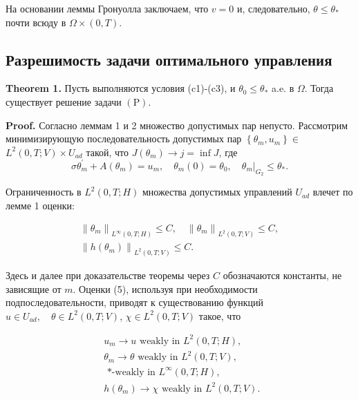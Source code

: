 На основании леммы Гронуолла заключаем,
что $v=0$ и, следовательно, $\theta \leq \theta_{*}$ почти всюду в $\Omega\times(0,T)$.

\subsection{Разрешимость задачи оптимального управления}
\label{subsec:ch3:sec2:subsec5}

\textbf{Theorem 1.}
Пусть выполняются условия (c1)-(c3), и $\theta_{0} \leq \theta_{*}$ a.e. в $\Omega$.
Тогда существует решение задачи $(\mathrm{P})$.

\textbf{Proof.}
Согласно леммам 1 и 2 множество допустимых пар непусто.
Рассмотрим минимизирующую последовательность допустимых
пар $\left\{\theta_{m}, u_{m}\right\} \in$ $L^{2}(0, T ; V) \times U_{a d}$
такой, что $J\left(\theta_{m}\right) \rightarrow j=\inf J$, где
\[
    \sigma \theta_{m}^{\prime}+A\left(\theta_{m}\right)=u_{m},
    \quad \theta_{m}(0)=\theta_{0},\left.\quad \theta_{m}\right|_{G_{2}} \leq \theta_{*} .
\]

Ограниченность в $L^{2}(0, T ; H)$ множества допустимых управлений $U_{a d}$ влечет по лемме 1 оценки:

\[
    \begin{gathered}
        \left\|\theta_{m}\right\|_{L^{\infty}(0, T ; H)} \leq C,
        \quad\left\|\theta_{m}\right\|_{L^{2}(0, T ; V)} \leq C, \\
        \left\|h\left(\theta_{m}\right)\right\|_{L^{2}(0, T ; V)} \leq C.
    \end{gathered}
\]

Здесь и далее при доказательстве теоремы через $C$ обозначаются константы, не зависящие от $m$.
Оценки (5), используя при необходимости подпоследовательности,
приводят к существованию функций
$u \in U_{a d}, \quad \theta \in L^{2}(0, T ; V)$, $\chi  \in L^{2}(0, T; V)$
такое, что

\[
    \begin{aligned}
        & u_{m} \rightarrow u \text { weakly in } L^{2}(0, T ; H), \\
        & \theta_{m} \rightarrow \theta \text { weakly in } L^{2}(0, T ; V) \text {, } \\
        & \text { *-weakly in } L^{\infty}(0, T ; H) \text {, } \\
        & h\left(\theta_{m}\right) \rightarrow \chi \text { weakly in } L^{2}(0, T ; V) \text {. }
    \end{aligned}
\]

